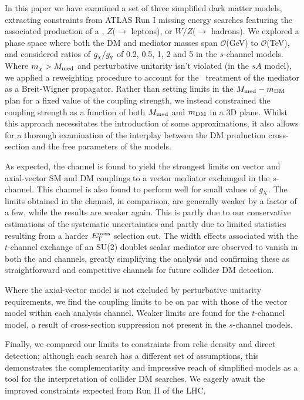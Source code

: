 
In this paper we have examined a set of three simplified dark matter models, extracting constraints from ATLAS Run I missing energy searches featuring the associated production of a \monojet, $Z(\rightarrow$ leptons), or $W/Z (\rightarrow$ hadrons). We explored a phase space where both the DM and mediator masses span $\mathcal{O}$(GeV) to $\mathcal{O}$(TeV), and considered ratios of $g_{\chi} / g_q$ of 0.2, 0.5, 1, 2 and 5 in the $s$-channel models. Where $m_{\chi} > M_{\mathrm{med}}$ and perturbative unitarity isn't violated (in the $sA$ model), we applied a reweighting procedure to account for the \MG~treatment of the mediator as a Breit-Wigner propagator.  Rather than setting limits in the $M_{\mathrm{med}} - m_{\mathrm{DM}}$ plan for a fixed value of the coupling strength, we instead constrained the coupling strength as a function of both $M_{\mathrm{med}}$ and $m_{\mathrm{DM}}$ in a 3D plane. Whilst this approach necessitates the introduction of some approximations, it also allows for a thorough examination of the interplay between the DM production cross-section and the free parameters of the models.

As expected, the \monojet channel is found to yield the strongest limits on vector and axial-vector SM and DM couplings to a vector mediator exchanged in the $s$-channel. This channel is also found to perform well for small values of $g_{\chi}$. The limits obtained in the \monoZ channel, in comparison, are generally weaker by a factor of a few, while the \monoWZ results are weaker again. This is partly due to our conservative estimations of the systematic uncertainties and partly due to limited statistics resulting from a harder $E_{\mathrm{T}}^{\mathrm{miss}}$ selection cut. The width effects associated with the $t$-channel exchange of an SU(2) doublet scalar mediator are observed to vanish in both the \monoZ and \monoWZ channels, greatly simplifying the analysis and confirming these as straightforward and competitive channels for future collider DM detection.

Where the axial-vector model is not excluded by perturbative unitarity requirements, we find the coupling limits to be on par with those of the vector model within each analysis channel. Weaker limits are found for the $t$-channel model, a result of cross-section suppression not present in the $s$-channel models.

Finally, we compared our limits to constraints from relic density and direct detection; although each search has a different set of assumptions, this demonstrates the complementarity and impressive reach of simplified models as a tool for the interpretation of collider DM searches. We eagerly await the improved constraints expected from Run II of the LHC.

